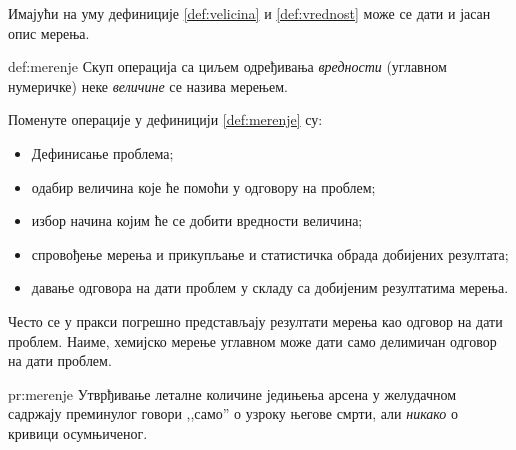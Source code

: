 Имајући на уму дефиниције \ref{def:velicina} и \ref{def:vrednost} може
се дати и јасан опис мерења.

\begin{df}[Мерење]{def:merenje}
  Скуп операција са циљем одређивања \emph{вредности} (углавном
  нумеричке) неке \emph{величине} се назива мерењем.
\end{df}
Поменуте операције у дефиницији \ref{def:merenje} су:
\begin{itemize}[label={$\RHD$}]
\item Дефинисање проблема;
\item одабир величина које ће помоћи у одговору на проблем;
\item избор начина којим ће се добити вредности величина;
\item спровођење мерења и прикупљање и статистичка обрада
добијених резултата;
\item давање одговора на дати проблем у складу са добијеним
резултатима мерења.
\end{itemize}

Често се у пракси погрешно представљају резултати мерења као одговор
на дати проблем. Наиме, хемијско мерење углавном може дати само делимичан
одговор на дати проблем.
\begin{pr}[]{pr:merenje}
  Утврђивање леталне количине једињења арсена у желудачном садржају
  преминулог говори ,,само'' о узроку његове смрти, али \emph{никако}
  о кривици осумњиченог.
\end{pr}

\nocite{*}



